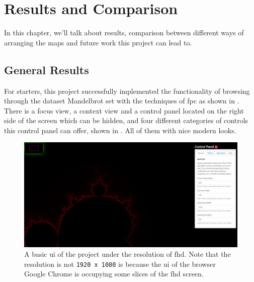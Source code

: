 
\chapter{Results and Comparison} %

\label{Chapter5} %

In this chapter, we'll talk about results, comparison between different ways of arranging the \glspl{map} and future work this project can lead to.


\section{General Results}

For starters, this project successfully implemented the functionality of browsing through the dataset Mandelbrot set with the techniques of \gls{fpc} as shown in . There is a focus view, a context view and a control panel located on the right side of the screen which can be hidden, and four different categories of controls this control panel can offer, shown in . All of them with nice modern looks.

\begin{figure}[H]
\centering
\includegraphics[width=\textwidth,keepaspectratio]{Figures/Chapter5/basic.png}
\decoRule
\caption[Basic UI]{A basic \gls{ui} of the project under the resolution of \gls{fhd}. Note that the resolution is not \texttt{1920 x 1080} is because the \gls{ui} of the browser Google Chrome is occupying some slices of the \gls{fhd} screen.}
\label{fig:chap5:basic}
\end{figure}

